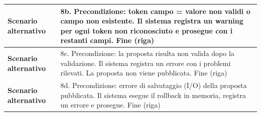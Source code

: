 \documentclass[12pt, a4paper, oneside]{report}
\begin{document}
\begin{tabularx}{\textwidth}{|l|X|}
    \textbf{Scenario alternativo} & 
    8b. Precondizione: token campo = valore non validi o campo non esistente.\newline
    Il sistema registra un warning per ogni token non riconosciuto e prosegue con i restanti campi.\newline
    Fine (riga) \\ \hline

    \textbf{Scenario alternativo} & 
    8c. Precondizione: la proposta risulta non valida dopo la validazione.\newline
    Il sistema registra un errore con i problemi rilevati. La proposta non viene pubblicata.\newline
    Fine (riga) \\ \hline

    \textbf{Scenario alternativo} & 
    8d. Precondizione: errore di salvataggio (I/O) della proposta pubblicata.\newline
    Il sistema esegue il rollback in memoria, registra un errore e prosegue.\newline
    Fine (riga) \\ \hline
\end{tabularx}

\renewcommand{\arraystretch}{1.4} 
\end{document}

